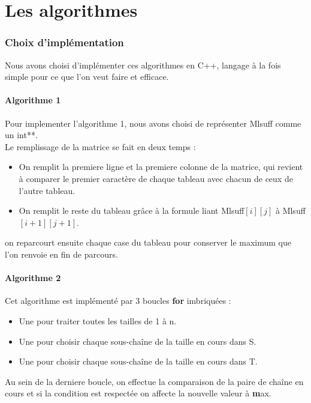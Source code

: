 \part{Les algorithmes}
\section{Choix d'implémentation}
  
  Nous avons choisi d'implémenter ces algorithmes en C++, langage à la fois simple pour ce que l'on veut faire et efficace.
  
  \subsection{Algorithme 1}
  Pour implementer l'algorithme 1, nous avons choisi de représenter Mlsuff comme un int**.\\
  
  Le remplissage de la matrice se fait en deux temps : \begin{itemize}
  \item On remplit la premiere ligne et la premiere colonne de la matrice, qui revient à comparer le premier caractère de chaque tableau avec chacun de ceux de l'autre tableau.
  \item On remplit le reste du tableau grâce à la formule liant Mlsuff$[i][j]$ à Mlsuff$[i+1][j+1]$.
  \end{itemize}
  \vspace{0.5cm}
  
  on reparcourt ensuite chaque case du tableau pour conserver le maximum que l'on renvoie en fin de parcours.\\
  
  \subsection{Algorithme 2}
  
	Cet algorithme est implémenté par 3 boucles \textbf{for} imbriquées : \begin{itemize}
\item Une pour traiter toutes les tailles de 1 à n.
\item Une pour choisir chaque sous-chaîne de la taille en cours dans S.
\item Une pour choisir chaque sous-chaîne de la taille en cours dans T.
 \end{itemize}
 \vspace{0.5cm}
 
 Au sein de la derniere boucle, on effectue la comparaison de la paire de chaîne en cours et si la condition est respectée on affecte la nouvelle valeur à {\textbf max}.
 
